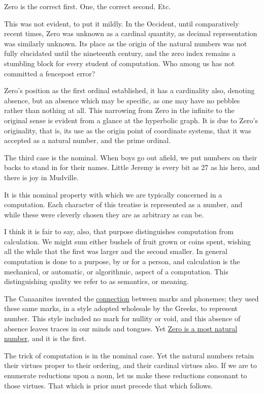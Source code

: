 \documentclass[twoside]{article}
\begin{document}
Zero is the correct first.  One, the correct second.  Etc.

This was not evident, to put it mildly. In the Occident, until comparatively recent times, Zero was unknown as a cardinal quantity, as decimal representation was similarly unknown. Its place as the origin of the natural numbers was not fully elucidated until the nineteenth century, and the zero index remains a stumbling block for every student of computation. Who among us has not committed a fencepost error?

Zero's position as the first ordinal established, it has a cardinality also, denoting absence, but an absence which may be specific, as one may have no pebbles rather than nothing at all. This narrowing from Zero in the infinite to the original sense is evident from a glance at the hyperbolic graph. It is due to Zero's originality, that is, its use as the origin point of coordinate systems, that it was accepted as a natural number, and the prime ordinal.

The third case is the nominal. When boys go out afield, we put numbers on their backs to stand in for their names. Little Jeremy is every bit as 27 as his hero, and there is joy in Mudville.

It is this nominal property with which we are typically concerned in a computation. Each character of this treatise is represented as a number, and while these were cleverly chosen they are as arbitrary as can be.

I think it is fair to say, also, that purpose distinguishes computation from calculation. We might sum either bushels of fruit grown or coins spent, wishing all the while that the first was larger and the second smaller. In general computation is done to a purpose, by or for a person, and calculation is the mechanical, or automatic, or algorithmic, aspect of a computation. This distinguishing quality we refer to as semantics, or meaning.

The Canaanites invented the \href{https://en.wikipedia.org/wiki/Alphabet}{connection} between marks and phonemes; they used these same marks, in a style adopted wholesale by the Greeks, to represent number. This style included no mark for nullity or void, and this absence of absence leaves traces in our minds and tongues. Yet \href{https://www.cs.utexas.edu/users/EWD/transcriptions/EWD08xx/EWD831.html}{Zero is a most natural number}, and it is the first.

The trick of computation is in the nominal case. Yet the natural numbers retain their virtues proper to their ordering, and their cardinal virtues also. If we are to enumerate reductions upon a noun, let us make these reductions consonant to those virtues. That which is prior must precede that which follows.
\end{document}
